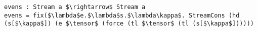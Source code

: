 \begin{lstlisting}[mathescape]
evens : Stream a $\rightarrow$ Stream a
evens = fix($\lambda$e.$\lambda$s.$\lambda\kappa$. StreamCons (hd (s[$\kappa$]) (e $\tensor$ (force (tl $\tensor$ (tl (s[$\kappa$])))))
\end{lstlisting}
